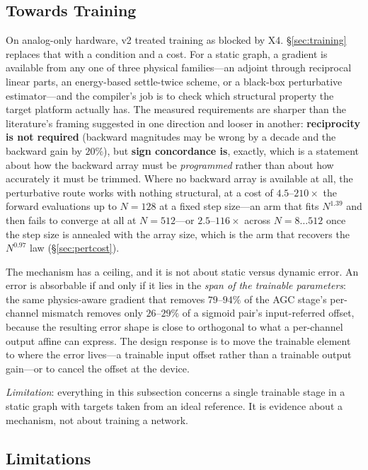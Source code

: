 \documentclass[11pt]{article}
\begin{document}
\subsection{Towards Training}

On analog-only hardware, v2 treated training as blocked by X4. \S\ref{sec:training} replaces that with a condition and a cost. For a static graph, a gradient is available from any one of three physical families---an adjoint through reciprocal linear parts, an energy-based settle-twice scheme, or a black-box perturbative estimator---and the compiler's job is to check which structural property the target platform actually has. The measured requirements are sharper than the literature's framing suggested in one direction and looser in another: \textbf{reciprocity is not required} (backward magnitudes may be wrong by a decade and the backward gain by $20\%$), but \textbf{sign concordance is}, exactly, which is a statement about how the backward array must be \textit{programmed} rather than about how accurately it must be trimmed. Where no backward array is available at all, the perturbative route works with nothing structural, at a cost of $4.5$--$210\times$ the forward evaluations up to $N = 128$ at a fixed step size---an arm that fits $N^{1.39}$ and then fails to converge at all at $N = 512$---or $2.5$--$116\times$ across $N = 8\ldots512$ once the step size is annealed with the array size, which is the arm that recovers the $N^{0.97}$ law (\S\ref{sec:pertcost}).

The mechanism has a ceiling, and it is not about static versus dynamic error. An error is absorbable if and only if it lies in the \textit{span of the trainable parameters}: the same physics-aware gradient that removes $79$--$94\%$ of the AGC stage's per-channel mismatch removes only $26$--$29\%$ of a sigmoid pair's input-referred offset, because the resulting error shape is close to orthogonal to what a per-channel output affine can express. The design response is to move the trainable element to where the error lives---a trainable input offset rather than a trainable output gain---or to cancel the offset at the device.

\textit{Limitation}: everything in this subsection concerns a single trainable stage in a static graph with targets taken from an ideal reference. It is evidence about a mechanism, not about training a network.

\subsection{Limitations}
\label{sec:limitations}
\end{document}
